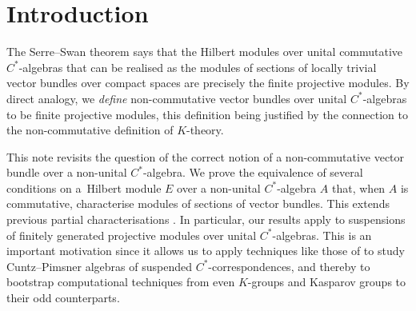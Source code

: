 \documentclass[pdftex]{sigma}
\numberwithin{equation}{section}
\begin{document}
\allowdisplaybreaks

\newcommand{\arXivNumber}{1612.03559}

\renewcommand{\PaperNumber}{041}

\FirstPageHeading








\section{Introduction}\label{sec:intro}

The Serre--Swan theorem says that the Hilbert modules over unital commutative $C^*$-algebras that can be realised as the modules of sections of locally trivial vector bundles over compact spaces are precisely the f\/inite projective modules. By direct analogy, we \emph{define} non-commutative vector bundles over unital $C^*$-algebras to be f\/inite projective modules, this def\/inition being justif\/ied by the connection to the non-commutative def\/inition of $K$-theory.

This note revisits the question of the correct notion of a non-commutative vector bundle over a non-unital $C^*$-algebra. We prove the equivalence of several conditions on a~Hilbert module $E$ over a non-unital $C^*$-algebra $A$ that, when $A$ is commutative, characterise modules of sections of vector bundles. This extends previous partial characterisations \cite{RennieSmooth}. In particular, our results apply to suspensions of f\/initely generated projective modules over unital $C^*$-algebras. This is an important motivation since it allows us to apply techniques like those of \cite{RRSext} to study Cuntz--Pimsner algebras of suspended $C^*$-correspondences, and thereby to bootstrap computational techniques from even $K$-groups and Kasparov groups to their odd counterparts.
\end{document}
